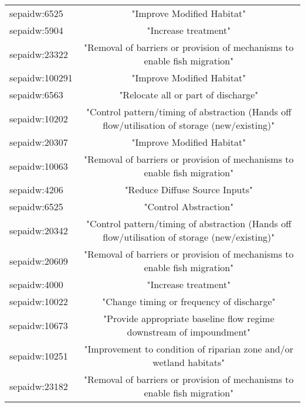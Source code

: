 \documentclass[a4paper,10pt]{article}
\begin{document}
\begin{table}[!tb]
\begin{center}
\begin{tabular}{ l c}
 sepaidw:6525   & "Improve Modified Habitat"  \\                                                                   
 sepaidw:5904   & "Increase treatment"   \\                                                                        
 sepaidw:23322  & "Removal of barriers or provision of mechanisms to enable fish migration"    \\                  
 sepaidw:100291 & "Improve Modified Habitat" \\                                                                    
 sepaidw:6563   & "Relocate all or part of discharge"   \\                                                         
 sepaidw:10202  & "Control pattern/timing of abstraction (Hands off flow/utilisation of storage (new/existing)" \\ 
sepaidw:20307  & "Improve Modified Habitat"          \\                                                           
 sepaidw:10063  & "Removal of barriers or provision of mechanisms to enable fish migration" \\                     
 sepaidw:4206   & "Reduce Diffuse Source Inputs"  \\                                                               
 sepaidw:6525   & "Control Abstraction"     \\                                                                     
 sepaidw:20342  & "Control pattern/timing of abstraction (Hands off flow/utilisation of storage (new/existing)" \\ 
 sepaidw:20609  & "Removal of barriers or provision of mechanisms to enable fish migration"      \\                
 sepaidw:4000   & "Increase treatment"        \\                                                                   
 sepaidw:10022  & "Change timing or frequency of discharge"    \\                                                  
 sepaidw:10673  & "Provide appropriate baseline flow regime downstream of impoundment"        \\                   
 sepaidw:10251  & "Improvement to condition of riparian zone and/or wetland habitats"   \\                         
sepaidw:23182  & "Removal of barriers or provision of mechanisms to enable fish migration"   \\                   

\end{tabular}
\end{center}
\end{table}
\end{document}
